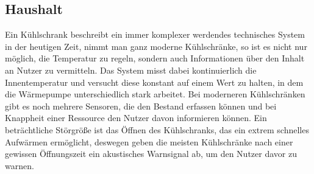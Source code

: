 \documentclass[12pt,a4paper,ngerman]{article}
\begin{document}
\subsection*{Haushalt}
Ein Kühlschrank beschreibt ein immer komplexer werdendes technisches System in der heutigen Zeit, nimmt man ganz moderne Kühlschränke, so ist es nicht nur möglich, die Temperatur zu regeln, sondern auch Informationen über den Inhalt an Nutzer zu vermitteln. Das System misst dabei kontinuierlich die Innentemperatur und versucht diese konstant auf einem Wert zu halten, in dem die Wärmepumpe unterschiedlich stark arbeitet. Bei moderneren Kühlschränken gibt es noch mehrere Sensoren, die den Bestand erfassen können und bei Knappheit einer Ressource den Nutzer davon informieren können. 
Ein beträchtliche Störgröße ist das Öffnen des Kühlschranks, das ein extrem schnelles Aufwärmen ermöglicht, deswegen geben die meisten Kühlschränke nach einer gewissen Öffnungszeit ein akustisches Warnsignal ab, um den Nutzer davor zu warnen. 

   
\end{document}
